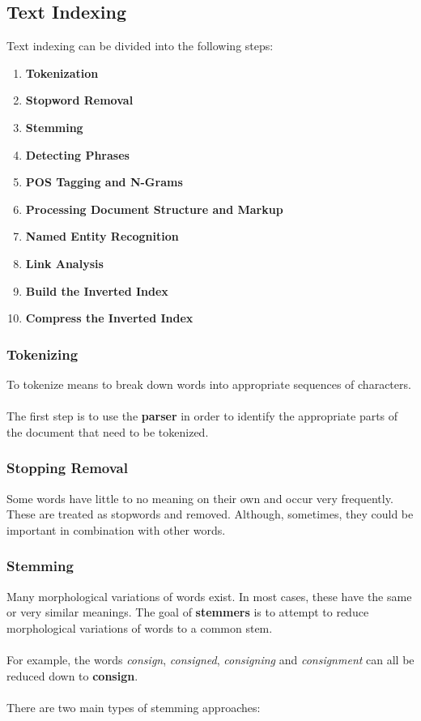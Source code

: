 \documentclass{article}
\begin{document}
\subsection{Text Indexing}
Text indexing can be divided into the following steps:

\begin{enumerate}
	\item \textbf{Tokenization}
	\item \textbf{Stopword Removal}
	\item \textbf{Stemming}
	\item \textbf{Detecting Phrases}
	\item \textbf{POS Tagging and N-Grams}
	\item \textbf{Processing Document Structure and Markup}
	\item \textbf{Named Entity Recognition}
	\item \textbf{Link Analysis}
	\item \textbf{Build the Inverted Index}
	\item \textbf{Compress the Inverted Index}
\end{enumerate}

\subsubsection{Tokenizing}
To tokenize means to break down words into appropriate sequences of characters. \\ \\
The first step is to use the \textbf{parser} in order to identify the appropriate parts of the document that need to be tokenized.

\subsubsection{Stopping Removal}
Some words have little to no meaning on their own and occur very frequently. These are treated as stopwords and removed. Although, sometimes, they could be important in combination with other words.

\subsubsection{Stemming}
Many morphological variations of words exist. In most cases, these have the same or very similar meanings. The goal of \textbf{stemmers} is to attempt to reduce morphological variations of words to a common stem. \\ \\
For example, the words \textit{consign}, \textit{consigned}, \textit{consigning} and \textit{consignment} can all be reduced down to \textbf{consign}. \\ \\
There are two main types of stemming approaches:
\end{document}
